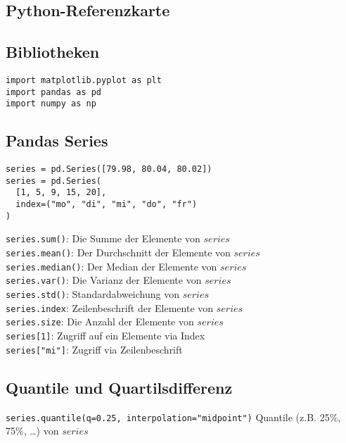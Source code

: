 \documentclass[14pt]{article}
\begin{document}
\begin{center}
	\section*{Python-Referenzkarte}
\end{center}
\begin{multicols}{3}

\subsection*{Bibliotheken}
\begin{verbatim}
import matplotlib.pyplot as plt
import pandas as pd
import numpy as np
\end{verbatim}

\subsection*{Pandas Series}
\begin{verbatim}
series = pd.Series([79.98, 80.04, 80.02])
series = pd.Series(
  [1, 5, 9, 15, 20],
  index=("mo", "di", "mi", "do", "fr")
)
\end{verbatim}

\texttt{series.sum()}: Die Summe der Elemente von $series$ \\
\texttt{series.mean()}: Der Durchschnitt der Elemente von $series$ \\
\texttt{series.median()}: Der Median der Elemente von $series$ \\
\texttt{series.var()}: Die Varianz der Elemente von $series$ \\
\texttt{series.std()}: Standardabweichung von $series$ \\
\texttt{series.index}: Zeilenbeschrift der Elemente von $series$ \\
\texttt{series.size}: Die Anzahl der Elemente von $series$ \\
\texttt{series[1]}: Zugriff auf ein Elemente via Index \\
\texttt{series["mi"]}: Zugriff via Zeilenbeschrift 

\subsection*{Quantile und Quartilsdifferenz}
\texttt{series.quantile(q=0.25, interpolation="midpoint")}
Quantile (z.B. 25\%, 75\%, \dots) von $series$ \\


\end{multicols}
\end{document}
